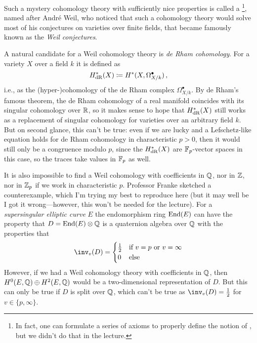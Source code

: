 \documentclass[a4paper, 10pt, oneside, DIV=9, chapterprefix=true, numbers=enddot, bibliography=totoc]{scrbook}
\begin{document}
Such a mystery cohomology theory with sufficiently nice properties is called a \footnote{In fact, one can formulate a series of axioms to properly define the notion of , but we didn't do that in the lecture.}, named after André Weil, who noticed that such a cohomology theory would solve most of his conjectures on varieties over finite fields, that became famously known as the \emph{Weil conjectures}.

\begin{cntx}
A natural candidate for a Weil cohomology theory is \emph{de Rham cohomology}. For a variety $X$ over a field $k$ it is defined as 
\begin{equation*}
	H_{\mathrm{dR}}^*(X)\coloneqq H^*(X,\Omega_{X/k}^\bullet)\,,
\end{equation*}
i.e., as the (hyper-)cohomology of the de Rham complex $\Omega_{X/k}^\bullet$.	By de Rham's famous theorem, the de Rham cohomology of a real manifold coincides with its singular cohomology over $\mathbb{R}$, so it makes sense to hope that $H_{\mathrm{dR}}^*(X)$ still works as a replacement of singular cohomology for varieties over an arbitrary field $k$. But on second glance, this can't be true: even if we are lucky and a Lefschetz-like equation holds for de Rham cohomology in characteristic $p >0$, then it would still only be a congruence modulo $p$, since the $H_{\mathrm{dR}}^*(X)$ are $\mathbb{F}_p$-vector spaces in this case, so the traces take values in $\mathbb{F}_p$ as well.
\end{cntx}
\begin{cntx}
It is also impossible to find a Weil cohomology with coefficients in $\mathbb{Q}$, nor in $\mathbb{Z}$, nor in $\mathbb{Z}_p$ if we work in characteristic $p$. Professor Franke sketched a counterexample, which I'm trying my best to reproduce here (but it may well be I got it wrong---however, this won't be needed for the lecture). For a \emph{supersingular elliptic curve} $E$ the endomorphism ring $\operatorname{End}(E)$ can have the property that $D=\operatorname{End}(E)\otimes \mathbb{Q}$ is a quaternion algebra over $\mathbb{Q}$ with the properties that
\begin{align*}
	\inv_v(D)=\begin{cases}
		\frac{1}{2} & \text{if }v=p\text{ or }v=\infty\\
		0 & \text{else}
	\end{cases}
\end{align*}
However, if we had a Weil cohomology theory with coefficients in $\mathbb{Q}$, then $H^0(E,\mathbb{Q})\oplus H^2(E,\mathbb{Q})$ would be a two-dimensional representation of $D$. But this can only be true if $D$ is split over $\mathbb{Q}$, which can't be true as $\inv_v(D)=\frac12$ for $v\in\{p,\infty\}$.
\end{cntx}
\end{document}
